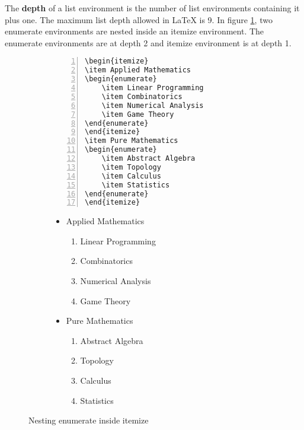 \documentclass{article}
\begin{document}
The \textbf{depth} of a list environment is the number of list environments containing it plus one. The maximum list depth allowed in \LaTeX{} is 9. In figure \ref{fig:nestedEnvironment}, two enumerate environments are nested inside an itemize environment. The enumerate environments are at depth 2 and itemize environment is at depth 1.
\begin{figure}[h]
\centering
\begin{subfigure}{0.45\textwidth}
\begin{Verbatim}[numbers = left]
\begin{itemize}
\item Applied Mathematics
\begin{enumerate}
	\item Linear Programming
	\item Combinatorics
	\item Numerical Analysis
	\item Game Theory
\end{enumerate}
\end{itemize}
\item Pure Mathematics
\begin{enumerate}
	\item Abstract Algebra
	\item Topology
	\item Calculus
	\item Statistics
\end{enumerate}
\end{itemize}
\end{Verbatim}
\end{subfigure}
\begin{subfigure}{0.45\textwidth}
\begin{itemize}
	\item Applied Mathematics
	\begin{enumerate}
		\item Linear Programming
		\item Combinatorics
		\item Numerical Analysis
		\item Game Theory
	\end{enumerate}
	\item Pure Mathematics
	\begin{enumerate}
		\item Abstract Algebra
		\item Topology
		\item Calculus
		\item Statistics
	\end{enumerate}
\end{itemize}
\end{subfigure} 
\caption{Nesting enumerate inside itemize}
\label{fig:nestedEnvironment}
\end{figure}
\end{document}
